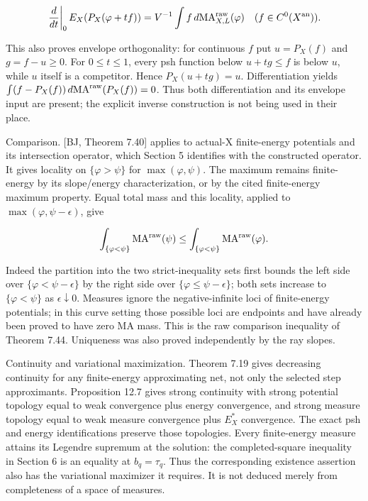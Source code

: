 \documentclass[11pt]{article}
\begin{document}
\[
 \left.\frac{d}{dt}\right|_0 E_X(P_X(\varphi+tf))
 =V^{-1}\int f\,d\mathrm{MA}^{\rm raw}_{X,L}(\varphi)
 \quad (f\in C^0(X^{\rm an})).
\]

This also proves envelope orthogonality: for continuous $f$ put $u=P_X(f)$ and $g=f-u\geq0$. For $0\leq t\leq1$, every psh function below $u+tg\leq f$ is below $u$, while $u$ itself is a competitor. Hence $P_X(u+tg)=u$. Differentiation yields $\int(f-P_X(f))\,d\mathrm{MA}^{\rm raw}(P_X(f))=0$. Thus both differentiation and its envelope input are present; the explicit inverse construction is not being used in their place.

Comparison. [BJ, Theorem 7.40] applies to actual-X finite-energy potentials and its intersection operator, which Section 5 identifies with the constructed operator. It gives locality on $\{\varphi>\psi\}$ for $\max(\varphi,\psi)$. The maximum remains finite-energy by its slope/energy characterization, or by the cited finite-energy maximum property. Equal total mass and this locality, applied to $\max(\varphi,\psi-\epsilon)$, give

\[
 \int_{\{\varphi<\psi\}}\mathrm{MA}^{\rm raw}(\psi)
 \leq\int_{\{\varphi<\psi\}}\mathrm{MA}^{\rm raw}(\varphi).
\]

Indeed the partition into the two strict-inequality sets first bounds the left side over $\{\varphi<\psi-\epsilon\}$ by the right side over $\{\varphi\leq\psi-\epsilon\}$; both sets increase to $\{\varphi<\psi\}$ as $\epsilon\downarrow0$. Measures ignore the negative-infinite loci of finite-energy potentials; in this curve setting those possible loci are endpoints and have already been proved to have zero MA mass. This is the raw comparison inequality of Theorem 7.44. Uniqueness was also proved independently by the ray slopes.

Continuity and variational maximization. Theorem 7.19 gives decreasing continuity for any finite-energy approximating net, not only the selected step approximants. Proposition 12.7 gives strong continuity with strong potential topology equal to weak convergence plus energy convergence, and strong measure topology equal to weak measure convergence plus $E_X^*$ convergence. The exact psh and energy identifications preserve those topologies. Every finite-energy measure attains its Legendre supremum at the solution: the completed-square inequality in Section 6 is an equality at $b_q=\tau_q$. Thus the corresponding existence assertion also has the variational maximizer it requires. It is not deduced merely from completeness of a space of measures.
\end{document}
